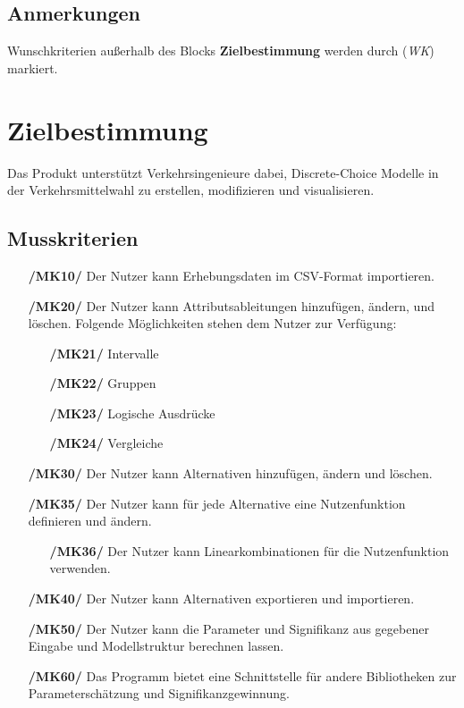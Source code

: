 \documentclass{article}
\begin{document}
\subsection{Anmerkungen}
Wunschkriterien außerhalb des Blocks \textbf{Zielbestimmung} werden durch (\textit{WK}) markiert.

\clearpage
\section{Zielbestimmung}
Das Produkt unterstützt Verkehrsingenieure dabei, Discrete-Choice Modelle in der Verkehrsmittelwahl zu erstellen, modifizieren und visualisieren.
\subsection{Musskriterien}
\begin{itemize}
    \item[\textbf{/MK10/}] Der Nutzer kann Erhebungsdaten im CSV-Format importieren.
    \item[\textbf{/MK20/}] Der Nutzer kann Attributsableitungen hinzufügen, ändern, und löschen.
    \newline Folgende Möglichkeiten stehen dem Nutzer zur Verfügung:
    \begin{itemize}[leftmargin=.7in]
        \item[\textbf{/MK21/}] Intervalle
        \item[\textbf{/MK22/}] Gruppen
        \item[\textbf{/MK23/}] Logische Ausdrücke
        \item[\textbf{/MK24/}] Vergleiche
    \end{itemize}
    \item[\textbf{/MK30/}] Der Nutzer kann Alternativen hinzufügen, ändern und löschen.
    \item[\textbf{/MK35/}] Der Nutzer kann für jede Alternative eine Nutzenfunktion definieren und ändern.
    \begin{itemize}[leftmargin=.7in]
        \item[\textbf{/MK36/}] Der Nutzer kann Linearkombinationen für die Nutzenfunktion verwenden.
    \end{itemize}
    \item[\textbf{/MK40/}] Der Nutzer kann Alternativen exportieren und importieren.
    \item[\textbf{/MK50/}] Der Nutzer kann die Parameter und Signifikanz aus gegebener Eingabe und Modellstruktur berechnen lassen.
    \item[\textbf{/MK60/}] Das Programm bietet eine Schnittstelle für andere Bibliotheken zur Parameterschätzung und Signifikanzgewinnung. 

\end{itemize}
\end{document}
